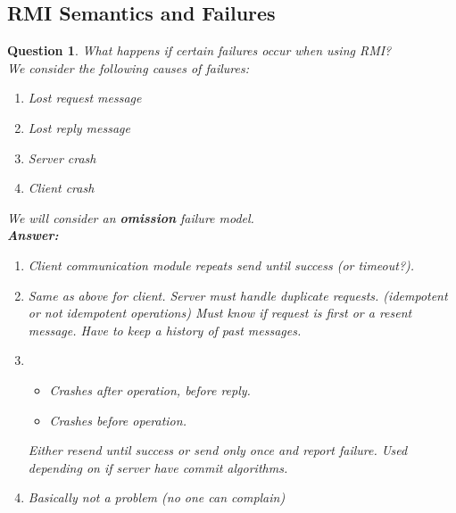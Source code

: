 \documentclass[a4paper]{article}
\newtheorem{question}{Question}
\begin{document}
\subsection{RMI Semantics and Failures}
\begin{question}
	What happens if certain failures occur when using RMI?\\
	We consider the following causes of failures:
	\begin{enumerate}
		\item Lost request message
		\item Lost reply message
		\item Server crash
		\item Client crash
	\end{enumerate}
	We will consider an \textbf{omission} failure model.\\
	\textbf{Answer:}
	\begin{enumerate}
		\item Client communication module repeats send until success (or timeout?). 
		\item Same as above for client. Server must handle duplicate
			requests. (idempotent or not idempotent operations) Must
			know if request is first or a resent message. Have to
			keep a history of past messages.
		\item \begin{itemize}
				\item Crashes after operation, before reply.
				\item Crashes before operation.
			\end{itemize}
			Either resend until success or send only once and report
			failure. Used depending on if server have commit
			algorithms.
		\item Basically not a problem (no one can complain)
	\end{enumerate}

\end{question}
\end{document}
